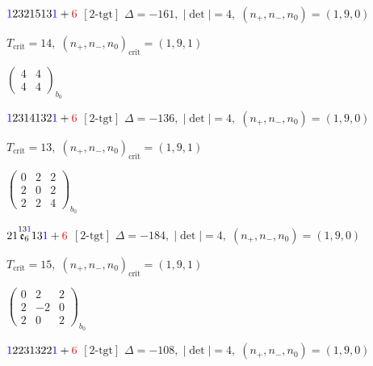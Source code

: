 \documentclass[10pt]{article}
\begin{document}
\smallskip

$\textcolor{blue}{1}2321513\textcolor{blue}{1}+\textcolor{red}{6}$ $\scriptstyle [2\text{-tgt}]$ \quad $\Delta=-161,\; |\det|=4,\; (n_+,n_-,n_0)=(1,9,0)$

\hspace{1em}$T_{\text{crit}}=14,\; (n_+,n_-,n_0)_{\text{crit}}=(1,9,1)$

\hspace{2em}$\left(\begin{smallmatrix}4 & 4 \\ 4 & 4\end{smallmatrix}\right)_{\!b_0}$

\smallskip

$\textcolor{blue}{1}2314132\textcolor{blue}{1}+\textcolor{red}{6}$ $\scriptstyle [2\text{-tgt}]$ \quad $\Delta=-136,\; |\det|=4,\; (n_+,n_-,n_0)=(1,9,0)$

\hspace{1em}$T_{\text{crit}}=13,\; (n_+,n_-,n_0)_{\text{crit}}=(1,9,1)$

\hspace{2em}$\left(\begin{smallmatrix}0 & 2 & 2 \\ 2 & 0 & 2 \\ 2 & 2 & 4\end{smallmatrix}\right)_{\!b_0}$

\smallskip

$21\overset{13\textcolor{blue}{1}}{\mathfrak{e}_6}13\textcolor{blue}{1}+\textcolor{red}{6}$ $\scriptstyle [2\text{-tgt}]$ \quad $\Delta=-184,\; |\det|=4,\; (n_+,n_-,n_0)=(1,9,0)$

\hspace{1em}$T_{\text{crit}}=15,\; (n_+,n_-,n_0)_{\text{crit}}=(1,9,1)$

\hspace{2em}$\left(\begin{smallmatrix}0 & 2 & 2 \\ 2 & -2 & 0 \\ 2 & 0 & 2\end{smallmatrix}\right)_{\!b_0}$

\smallskip

$\textcolor{blue}{1}2231322\textcolor{blue}{1}+\textcolor{red}{6}$ $\scriptstyle [2\text{-tgt}]$ \quad $\Delta=-108,\; |\det|=4,\; (n_+,n_-,n_0)=(1,9,0)$
\end{document}
